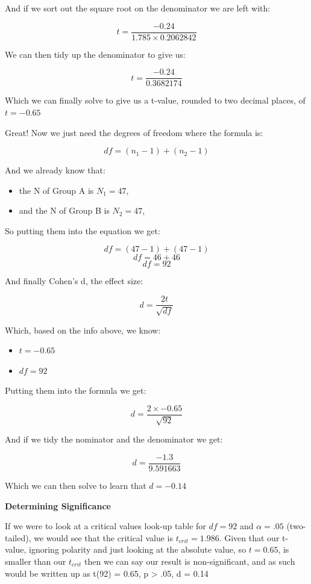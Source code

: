 \documentclass[
  oneside]{book}
\providecommand{\tightlist}{%
  \setlength{\itemsep}{0pt}\setlength{\parskip}{0pt}}
\begin{document}
And if we sort out the square root on the denominator we are left with:

\[t = \frac{-0.24}{1.785 \times 0.2062842}\]

We can then tidy up the denominator to give us:

\[t = \frac{-0.24}{0.3682174}\]

Which we can finally solve to give us a t-value, rounded to two decimal places, of \(t = -0.65\)

Great! Now we just need the degrees of freedom where the formula is:

\[df = (n_1 - 1) + (n_2 - 1)\]

And we already know that:

\begin{itemize}
\tightlist
\item
  the N of Group A is \(N_1 = 47\),
\item
  and the N of Group B is \(N_2 = 47\),
\end{itemize}

So putting them into the equation we get:

\[df = (47 - 1) + (47 - 1)\]
\[df = 46 + 46\]
\[df = 92\]

And finally Cohen's d, the effect size:

\[d = \frac{2t}{\sqrt{df}}\]

Which, based on the info above, we know:

\begin{itemize}
\tightlist
\item
  \(t = -0.65\)
\item
  \(df = 92\)
\end{itemize}

Putting them into the formula we get:

\[d = \frac{2 \times -0.65}{\sqrt{92}}\]

And if we tidy the nominator and the denominator we get:

\[d = \frac{-1.3}{9.591663}\]

Which we can then solve to learn that \(d = -0.14\)

\textbf{Determining Significance}

If we were to look at a critical values look-up table for \(df = 92\) and \(\alpha = .05\) (two-tailed), we would see that the critical value is \(t_{crit} = 1.986\). Given that our t-value, ignoring polarity and just looking at the absolute value, so \(t = 0.65\), is smaller than our \(t_{crit}\) then we can say our result is non-significant, and as such would be written up as t(92) = 0.65, p \textgreater{} .05, d = 0.14
\end{document}
